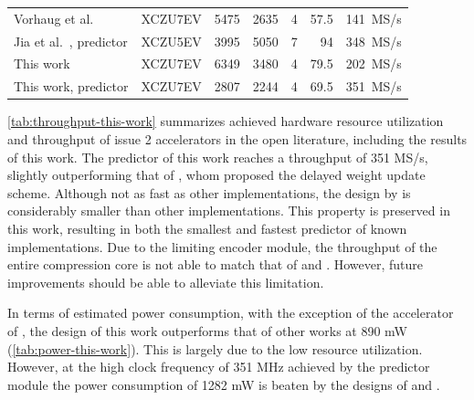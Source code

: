 \begin{table}[ht]
\begin{tabular}{l r r r r r r}
		Vorhaug et al.\ \cite{vorhaugHyperspectralImageCompression2024}                                              & XCZU7EV       & 5475         & 2635        & 4            & 57.5          & 141~MS/s            \\
		Jia et al.\ \cite{jiaRemovalFeedbackLoop2025}, predictor                                                     & XCZU5EV       & 3995         & 5050        & 7            & 94            & 348~MS/s            \\
		This work                                                                                                    & XCZU7EV       & 6349         & 3480        & 4            & 79.5          & 202~MS/s            \\
		This work, predictor                                                                                         & XCZU7EV       & 2807         & 2244        & 4            & 69.5          & 351~MS/s            \\
		\hline
	\end{tabular}
\end{table}

\autoref{tab:throughput-this-work} summarizes achieved hardware resource utilization and throughput of issue 2 accelerators in the open literature, including the results of this work. The predictor of this work reaches a throughput of 351 MS/s, slightly outperforming that of \citeauthor{jiaRemovalFeedbackLoop2025}, whom proposed the delayed weight update scheme. Although not as fast as other implementations, the design by \citeauthor{vorhaugHyperspectralImageCompression2024} is considerably smaller than other implementations. This property is preserved in this work, resulting in both the smallest and fastest predictor of known implementations. Due to the limiting encoder module, the throughput of the entire compression core is not able to match that of \citeauthor{basconesRealTimeFPGAImplementation2022} and \citeauthor{chatziantoniouScalableDataRateNearLossless2022a}. However, future improvements should be able to alleviate this limitation.

In terms of estimated power consumption, with the exception of the accelerator of \citeauthor{vorhaugHyperspectralImageCompression2024}, the design of this work outperforms that of other works at 890 mW (\autoref{tab:power-this-work}). This is largely due to the low resource utilization. However, at the high clock frequency of 351 MHz achieved by the predictor module the power consumption of 1282 mW is beaten by the designs of \citeauthor{basconesRealTimeFPGAImplementation2022} and \citeauthor{chatziantoniouScalableDataRateNearLossless2022a}.

